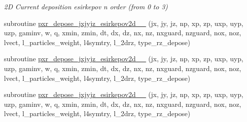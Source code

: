 \begin{DoxyCompactItemize}
\begin{DoxyCompactList}\small\item\em 2D Current deposition esirkepov n order (from 0 to 3) \end{DoxyCompactList}\item 
subroutine \hyperlink{current__deposition__2d_8_f90_afe150c6f9a46d86a94382abd2ad2dee5}{pxr\+\_\+depose\+\_\+jxjyjz\+\_\+esirkepov2d\+\_\+\_} (jx, jy, jz, np, xp, zp, uxp, uyp, uzp, gaminv, w, q, xmin, zmin,                                                                                                                                                                                               dt, dx, dz, nx, nz, nxguard, nzguard,                                                                                                                                                                                               nox, noz, lvect, l\+\_\+particles\+\_\+weight, l4symtry, l\+\_\+2drz, type\+\_\+rz\+\_\+depose)
\item 
subroutine \hyperlink{current__deposition__2d_8_f90_a439e9054acf0ed39dd909d54226b1ba0}{pxr\+\_\+depose\+\_\+jxjyjz\+\_\+esirkepov2d\+\_\+\_} (jx, jy, jz, np, xp, zp, uxp, uyp, uzp, gaminv, w, q, xmin, zmin,                                                                                                                                                                                               dt, dx, dz, nx, nz, nxguard, nzguard,                                                                                                                                                                                               nox, noz, lvect, l\+\_\+particles\+\_\+weight, l4symtry, l\+\_\+2drz, type\+\_\+rz\+\_\+depose)
\item 
subroutine \hyperlink{current__deposition__2d_8_f90_a6843700efcf408ff15287bbb6c67747e}{pxr\+\_\+depose\+\_\+jxjyjz\+\_\+esirkepov2d\+\_\+\_} (jx, jy, jz, np, xp, zp, uxp, uyp, uzp, gaminv, w, q, xmin, zmin,                                                                                                                                                                                               dt, dx, dz, nx, nz, nxguard, nzguard,                                                                                                                                                                                               nox, noz, lvect, l\+\_\+particles\+\_\+weight, l4symtry, l\+\_\+2drz, type\+\_\+rz\+\_\+depose)
\item 

\end{DoxyCompactItemize}
